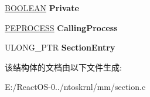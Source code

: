 \begin{DoxyCompactItemize}
\hyperlink{_processor_bind_8h_a112e3146cb38b6ee95e64d85842e380a}{B\+O\+O\+L\+E\+AN} {\bfseries Private}
\item 
\mbox{\label{struct_m_m___s_e_c_t_i_o_n___p_a_g_e_o_u_t___c_o_n_t_e_x_t_a52538be48538365e8e8beb35b3f69ea4}} 
\hyperlink{struct___e_p_r_o_c_e_s_s}{P\+E\+P\+R\+O\+C\+E\+SS} {\bfseries Calling\+Process}
\item 
\mbox{\label{struct_m_m___s_e_c_t_i_o_n___p_a_g_e_o_u_t___c_o_n_t_e_x_t_a1b7ce8d864c140428d2bc3d0e80a3862}} 
U\+L\+O\+N\+G\+\_\+\+P\+TR {\bfseries Section\+Entry}
\end{DoxyCompactItemize}


该结构体的文档由以下文件生成\+:\begin{DoxyCompactItemize}
\item 
E\+:/\+React\+O\+S-\/0../ntoskrnl/mm/section.\+c\end{DoxyCompactItemize}
